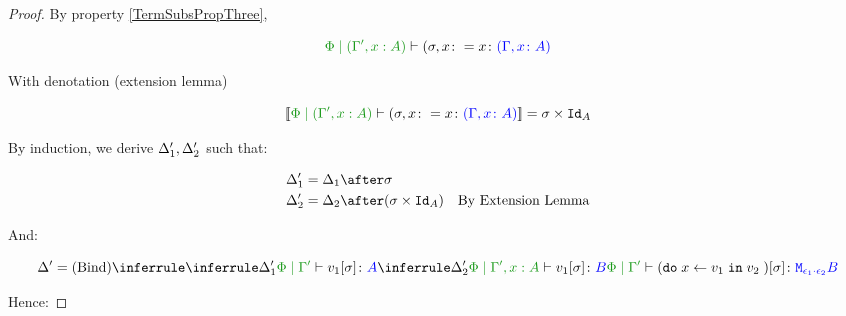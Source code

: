 \documentclass{report}
\begin{document}
\begin{framed}
\begin{proof}
        By property \ref{TermSubsPropThree},
        
        \begin{equation}
            \etyperelation{\P}{(\G', x:A)}{(\si, x\setto x}{(\gax)}
        \end{equation}
        
        With denotation (extension lemma)
        
        \begin{equation}
            \deno{\etyperelation{\P}{(\G', x:A)}{(\si, x\setto x}{(\gax)}} = \si\times\Id{A}
        \end{equation}
        
        By induction, we derive $\Delta_1', \Delta_2'$ such that:
        
        \begin{align*}
            \D_1' & = \D_1\after \si\\
            \D_2' & = \D_2\after (\si\times\Id{A})\qt{By Extension Lemma}
        \end{align*}
        
        And:
        
        \begin{equation}
            \D' = \ntreeruleII{\vbind}{
                \treeruleI{\D_1'}{\etyperelation{\P}{\G'}{v_1\ssi}{A}}
                }{
                \treeruleI{\D_2'}{\etyperelation{\P}{\G', x:A }{v_1\ssi}{B}}
            }{
                \etyperelation{\P}{\G'}{(\doin{x}{v_1}{v_2})\ssi}{\M{\e_1\dot\e_2}{B}}
            }
        \end{equation}
        
        Hence:
        
        

\end{proof}
\end{framed}
\end{document}
